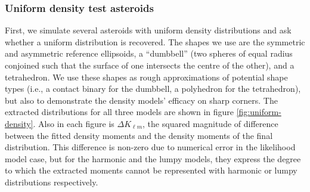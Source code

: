 \documentclass[fleqn,usenatbib]{mnras}
\begin{document}
\subsubsection{Uniform density test asteroids}

First, we simulate several asteroids with uniform density distributions and ask whether a uniform distribution is recovered. The shapes we use are the symmetric and asymmetric reference ellipsoids, a ``dumbbell'' (two spheres of equal radius conjoined such that the surface of one intersects the centre of the other), and a tetrahedron. We use these shapes as rough approximations of potential shape types (i.e., a contact binary for the dumbbell, a polyhedron for the tetrahedron), but also to demonstrate the density models' efficacy on sharp corners. The extracted distributions for all three models are shown in figure \ref{fig:uniform-density}. Also in each figure is $\Delta K_{\ell m}$, the squared magnitude of difference between the fitted density moments and the density moments of the final distribution. This difference is non-zero due to numerical error in the likelihood model case, but for the harmonic and the lumpy models, they express the degree to which the extracted moments cannot be represented with harmonic or lumpy distributions respectively.
\end{document}
